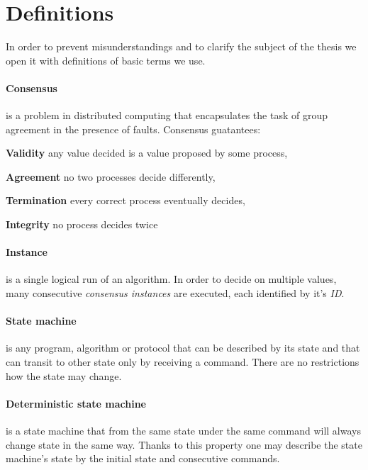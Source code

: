 \clearpage

\section{Definitions}

In order to prevent misunderstandings and to clarify the subject of the thesis we open it with definitions of
basic %
terms we use.


\paragraph{Consensus}
is a problem in distributed computing that encapsulates the task of group agreement in the presence of faults.
Consensus guatantees:

\begin{tightList}[\setlength{\leftmargin}{2\leftmargin}]
    \item[\textbf{Validity}] any value decided is a value proposed by some process,
    \item[\textbf{Agreement}] no two processes decide differently,
    \item[\textbf{Termination}] every correct process eventually decides,
    \item[\textbf{Integrity}] no process decides twice
\end{tightList}

\paragraph{Instance} is a single logical run of an algorithm. In order to decide on multiple values, many consecutive \textit{consensus instances} are executed, each identified by it's \textit{ID}.

\paragraph{State machine}
is any program, algorithm or protocol that can be described by its state and that can transit to other state only by receiving a command.
There are no restrictions how the state may change.

\paragraph{Deterministic state machine}
is a state machine that from the same state under the same command will always change state in the same way.
Thanks to this property one may describe the state machine's state by the initial state and consecutive commands. 


